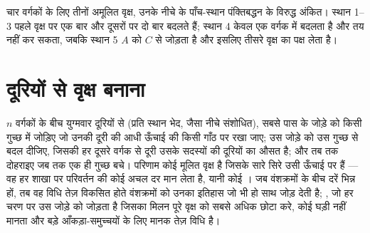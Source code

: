 \begin{omfigure}

{\small चार वर्गकों के लिए तीनों अमूलित वृक्ष, उनके नीचे के
पाँच-स्थान पंक्तिबद्धन के विरुद्ध अंकित। स्थान 1--3 पहले वृक्ष पर एक बार
और दूसरों पर दो बार बदलते हैं; स्थान 4 केवल एक वर्गक में बदलता है और
तय नहीं कर सकता, जबकि स्थान 5 $A$ को $C$ से जोड़ता है और इसलिए
तीसरे वृक्ष का पक्ष लेता है।}
\end{omfigure}

\section{दूरियों से वृक्ष बनाना}

\begin{method}[दूरी से गुच्छन: UPGMA]\label{meth:b2:phylogenetic-trees:upgma}
$n$ वर्गकों के बीच युग्मवार दूरियों से (प्रति स्थान भेद,
जैसा नीचे संशोधित), सबसे पास के जोड़े को किसी गुच्छ में जोड़िए जो उनकी दूरी की
आधी ऊँचाई की किसी गाँठ पर रखा जाए; उस जोड़े को उस
गुच्छ से बदल दीजिए, जिसकी हर दूसरे वर्गक से दूरी उसके
सदस्यों की दूरियों का औसत है; और तब तक दोहराइए जब तक एक ही गुच्छ बचे। परिणाम
कोई मूलित वृक्ष है जिसके सारे सिरे उसी ऊँचाई पर हैं --- वह हर शाखा पर
परिवर्तन की कोई अचल दर मान लेता है, यानी कोई । जब
वंशक्रमों के बीच दरें भिन्न हों, तब वह विधि तेज़ विकसित होते
वंशक्रमों को उनका इतिहास जो भी हो साथ जोड़ देती है; \emph{},
जो हर चरण पर उस जोड़े को जोड़ता है जिसका मिलन पूरे
वृक्ष को सबसे अधिक छोटा करे, कोई घड़ी नहीं मानता और बड़े आँकड़ा-समुच्चयों के लिए
मानक तेज़ विधि है।
\end{method}

